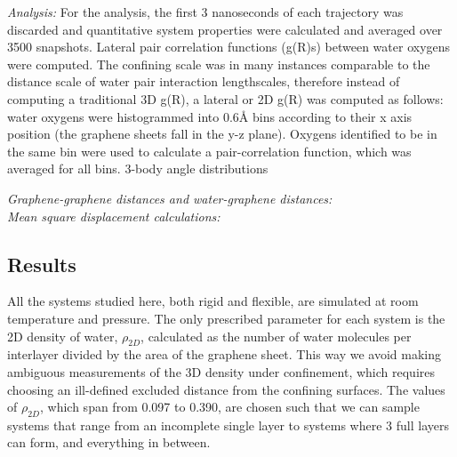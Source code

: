 \documentclass[12pt]{article}
\begin{document}
\textit{Analysis:} For the analysis, the first 3 nanoseconds of each trajectory was discarded and quantitative system properties were calculated and averaged over 3500 snapshots. Lateral pair correlation functions (g(R)s) between water oxygens were computed. The confining scale was in many instances comparable to the distance scale of water pair interaction lengthscales, therefore instead of computing a traditional 3D g(R), a lateral or 2D g(R) was computed as follows: water oxygens were histogrammed into 0.6\r A bins according to their x axis position (the graphene sheets fall in the y-z plane). Oxygens identified to be in the same bin were used to calculate a pair-correlation function, which was averaged for all bins. %
3-body angle distributions 

\textit{Graphene-graphene distances and water-graphene distances:} \\

\textit{Mean square displacement calculations:} \\

\subsection*{Results}

All the systems studied here, both rigid and flexible, are simulated at room temperature and pressure. The only prescribed parameter for each system is the 2D density of water, \(\rho_{2D}\), calculated as the number of water molecules per interlayer divided by the area of the graphene sheet. This way we avoid making ambiguous measurements of the 3D density under confinement, which requires choosing an ill-defined excluded distance from the confining surfaces. The values of \(\rho_{2D}\), which span from 0.097 to 0.390, are chosen such that we can sample systems that range from an incomplete single layer to systems where 3 full layers can form, and everything in between.
\end{document}
